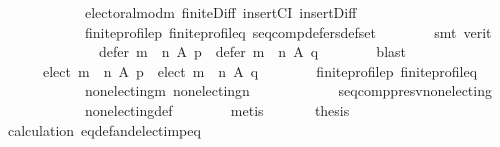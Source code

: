\begin{isabellebody}
\ \ \ \ \ \ \ \ \ \ \ \ electoral{\isacharunderscore}{\kern0pt}mod{\isacharunderscore}{\kern0pt}m\ finite{\isacharunderscore}{\kern0pt}Diff\ insertCI\ insert{\isacharunderscore}{\kern0pt}Diff\isanewline
\ \ \ \ \ \ \ \ \ \ \ \ finite{\isacharunderscore}{\kern0pt}profile{\isacharunderscore}{\kern0pt}p\ finite{\isacharunderscore}{\kern0pt}profile{\isacharunderscore}{\kern0pt}q\ seq{\isacharunderscore}{\kern0pt}comp{\isacharunderscore}{\kern0pt}defers{\isacharunderscore}{\kern0pt}def{\isacharunderscore}{\kern0pt}set\isanewline
\ \ \ \ \ \ \isamarkupfalse%
\ {\isacharparenleft}{\kern0pt}smt\ {\isacharparenleft}{\kern0pt}verit{\isacharparenright}{\kern0pt}{\isacharparenright}{\kern0pt}\isanewline
\ \ \ \ \isamarkupfalse%
\ \isamarkupfalse%
\ \isanewline
\ \ \ \ \ \ {\isachardoublequoteopen}defer\ {\isacharparenleft}{\kern0pt}m\ {\isasymtriangleright}\ n{\isacharparenright}{\kern0pt}\ A\ p\ {\isacharequal}{\kern0pt}\ defer\ {\isacharparenleft}{\kern0pt}m\ {\isasymtriangleright}\ n{\isacharparenright}{\kern0pt}\ A\ q{\isachardoublequoteclose}\isanewline
\ \ \ \ \ \ \isamarkupfalse%
\ blast\isanewline
\ \ \ \ \isamarkupfalse%
\ \isamarkupfalse%
\ \isanewline
\ \ \ \ \ \ {\isachardoublequoteopen}elect\ {\isacharparenleft}{\kern0pt}m\ {\isasymtriangleright}\ n{\isacharparenright}{\kern0pt}\ A\ p\ {\isacharequal}{\kern0pt}\ elect\ {\isacharparenleft}{\kern0pt}m\ {\isasymtriangleright}\ n{\isacharparenright}{\kern0pt}\ A\ q{\isachardoublequoteclose}\isanewline
\ \ \ \ \ \ \isamarkupfalse%
\ finite{\isacharunderscore}{\kern0pt}profile{\isacharunderscore}{\kern0pt}p\ finite{\isacharunderscore}{\kern0pt}profile{\isacharunderscore}{\kern0pt}q\isanewline
\ \ \ \ \ \ \ \ \ \ \ \ non{\isacharunderscore}{\kern0pt}electing{\isacharunderscore}{\kern0pt}m\ non{\isacharunderscore}{\kern0pt}electing{\isacharunderscore}{\kern0pt}n\isanewline
\ \ \ \ \ \ \ \ \ \ \ \ seq{\isacharunderscore}{\kern0pt}comp{\isacharunderscore}{\kern0pt}presv{\isacharunderscore}{\kern0pt}non{\isacharunderscore}{\kern0pt}electing\isanewline
\ \ \ \ \ \ \ \ \ \ \ \ non{\isacharunderscore}{\kern0pt}electing{\isacharunderscore}{\kern0pt}def\isanewline
\ \ \ \ \ \ \isamarkupfalse%
\ metis\ \isanewline
\ \ \ \ \isamarkupfalse%
\ {\isacharquery}{\kern0pt}thesis\isanewline
\ \ \ \ \ \ \isamarkupfalse%
\ calculation\ eq{\isacharunderscore}{\kern0pt}def{\isacharunderscore}{\kern0pt}and{\isacharunderscore}{\kern0pt}elect{\isacharunderscore}{\kern0pt}imp{\isacharunderscore}{\kern0pt}eq\isanewline

\end{isabellebody}
